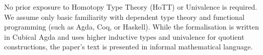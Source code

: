 No prior exposure to Homotopy Type Theory (HoTT) or Univalence is required. 
We assume only basic familiarity with dependent type theory and functional programming (such as Agda, Coq, or Haskell). 
While the formalisation is written in Cubical Agda and uses higher inductive types and univalence for quotient constructions, the paper's text is presented in informal mathematical language.
